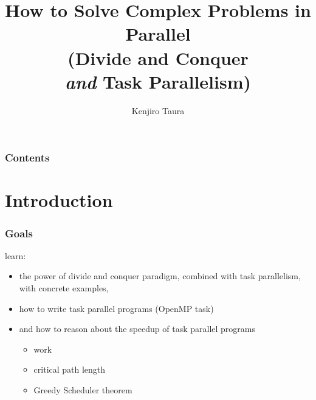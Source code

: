 \documentclass[12pt,dvipdfmx]{beamer}
\title{How to Solve Complex Problems in Parallel \\
(Divide and Conquer \\ {\em and\/} Task Parallelism)}
\institute{}
\author{Kenjiro Taura}
\date{}
\begin{document}
\maketitle

\begin{frame}
\frametitle{Contents}
\tableofcontents
\end{frame}

\section{Introduction}
\begin{frame}
\frametitle{Goals}
learn:
\begin{itemize}
\item the power of divide and conquer paradigm,
  combined with task parallelism, with concrete examples,

\item how to write task parallel programs (OpenMP task)

\item and how to reason about the speedup
  of task parallel programs
  \begin{itemize}
  \item work
  \item critical path length
  \item Greedy Scheduler theorem
  \end{itemize}
\end{itemize}
\end{frame}

\end{document}
